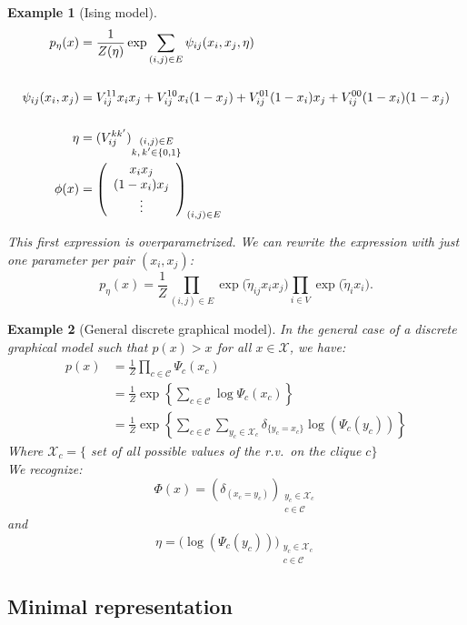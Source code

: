 \documentclass[12pt]{report}
\newtheorem{example}{Example}[section]
\begin{document}
\begin{example}[Ising model]

$$\begin{aligned}
p_\eta(x) &= \frac1{Z(\eta)} \exp \sum_{(i, j) \in E} \psi_{ij}(x_i, x_j, \eta)\\
\psi_{ij}(x_i, x_j) & = \rule{0mm}{2pc} V_{ij}^{11} x_i x_j + V_{ij}^{10} x_i (1 - x_j) + V_{ij}^{01} (1 - x_i) x_j + V_{ij}^{00} (1 - x_i) (1 - x_j)\\
\eta &= \rule{0mm}{2pc} (V_{ij}^{kk'})_{\substack{ (i, j) \in E\\ k,\, k' \in \{0, 1\}}}\\
\phi(x) &=\left( \begin{array}{c} x_i x_j\\ (1 - x_i) x_j \\ \vdots \end{array} \right)  _{(i, j) \in E}
\end{aligned}$$

This first expression is overparametrized. We can rewrite the expression with just one parameter per pair $(x_i , x_j)$:
\[ p_\eta(x) = \frac1Z \prod_{(i, j) \in E} \exp \big (\tilde\eta_{ij} x_i x_j \big ) \prod_{i \in V} \exp \big ( \tilde\eta_i x_i\big ). \]
\end{example}

\begin{example}[General discrete graphical model]
In the general case of a discrete graphical model such that $p(x)>x$ for all $x\in\mathcal{X}$, we have:
$$\begin{aligned}
p(x)&= \frac{1}{Z} \prod_{c\in\mathcal{C}}{\Psi_c (x_c)}\\
&=\frac{1}{Z} \exp \left\lbrace \sum_{c\in\mathcal{C}} \log \Psi_c (x_c) \right\rbrace\\
&=\frac{1}{Z} \exp \left\lbrace \sum_{c\in\mathcal{C}} \sum_{y_c \in \mathcal{X}_c} \delta _{\{y_c = x_c\}} \log (\Psi_c (y_c)) \right\rbrace
\end{aligned}$$
Where $\mathcal{X}_c =\{$ set of all possible values of the r.v.\ on the clique $c\}$\\
We recognize:
$$\Phi (x) = \left( \delta_{(x_c = y_c)}\right) _{\substack{ y_c\in\mathcal{X}_c\\ c\in \mathcal{C}}}$$
and
$$\eta = \big( \log (\Psi_c (y_c)) \big ) _{\substack{ y_c\in\mathcal{X}_c\\ c\in \mathcal{C}}}$$
\end{example}

\subsection{Minimal representation}
\end{document}
